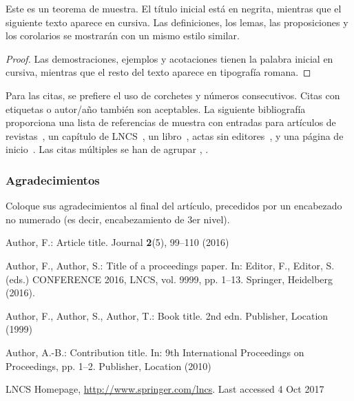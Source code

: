 \documentclass[runningheads]{sistedes}
\begin{document}
\begin{theorem}
Este es un teorema de muestra. El título inicial está en negrita, mientras
que el siguiente texto aparece en cursiva. Las definiciones, los lemas,
las proposiciones y los corolarios se mostrarán con un  mismo estilo similar.
\end{theorem}
%
%
\begin{proof}
Las demostraciones, ejemplos y acotaciones tienen la palabra inicial en cursiva,
mientras que el resto del texto aparece en tipografía romana.
\end{proof}
Para las citas, se prefiere el uso de corchetes
y números consecutivos. Citas con etiquetas o autor/año también
son aceptables. La siguiente bibliografía proporciona una lista de referencias
de muestra con entradas para artículos de revistas~\cite{ref_article1},
un capítulo de LNCS~\cite{ref_lncs1}, un libro~\cite{ref_book1},
actas sin editores~\cite{ref_proc1}, y una página de inicio~\cite{ref_url1}.
Las citas múltiples se han de agrupar
\cite{ref_article1,ref_lncs1,ref_book1},
\cite{ref_article1,ref_book1,ref_proc1,ref_url1}.

\subsubsection{Agradecimientos} Coloque sus agradecimientos al final del
artículo, precedidos por un encabezado no numerado (es decir, encabezamiento
de 3er nivel).

%
%
%
% 
% 
%
\begin{thebibliography}{8}
Author, F.: Article title. Journal \textbf{2}(5), 99--110 (2016)

Author, F., Author, S.: Title of a proceedings paper. In: Editor,
F., Editor, S. (eds.) CONFERENCE 2016, LNCS, vol. 9999, pp. 1--13.
Springer, Heidelberg (2016). 

Author, F., Author, S., Author, T.: Book title. 2nd edn. Publisher,
Location (1999)

Author, A.-B.: Contribution title. In: 9th International Proceedings
on Proceedings, pp. 1--2. Publisher, Location (2010)

LNCS Homepage, \url{http://www.springer.com/lncs}. Last accessed 4
Oct 2017
\end{thebibliography}
\end{document}
